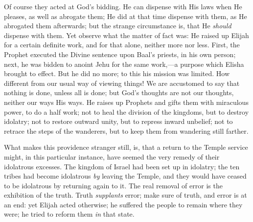 Of course they acted at God's bidding. He can dispense with His
laws when He pleases, as well as abrogate them; He did at that time
dispense with them, as He abrogated them afterwards; but the strange
circumstance is, that He \emph{should} dispense with them. Yet observe
what the matter of fact was: He raised up Elijah for a certain
definite work, and for that alone, neither more nor less. First, the
Prophet executed the Divine sentence upon Baal's priests, in his own
person; next, he was bidden to anoint Jehu for the same work,—a
purpose which Elisha brought to effect. But he did no more; to this
his mission was limited. How different from our usual way of viewing
things! We are accustomed to say that nothing is done, unless all is
done; but God's thoughts are not our thoughts, neither our ways His
ways. He raises up Prophets and gifts them with miraculous power, to
do a half work; not to heal the division of the kingdoms, but to
destroy idolatry; not to restore outward unity, but to repress inward
unbelief; not to retrace the steps of the wanderers, but to keep them
from wandering still farther.

What makes this providence stranger still, is, that a return to the
Temple service might, in this particular instance, have seemed the
very remedy of their idolatrous excesses. The kingdom of Israel had
been set up in idolatry; the ten tribes had become idolatrous \emph{by}
leaving the Temple, and they would have ceased to be idolatrous by
returning again to it. The real removal of error is the exhibition of
the truth. Truth \emph{supplants} error; make sure of truth, and error
is at an end: yet Elijah acted otherwise; he suffered the people to
remain where they were; he tried to reform them \emph{in} that state.


